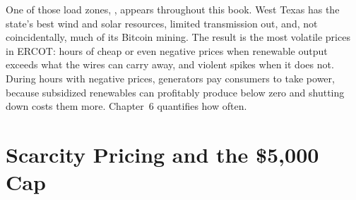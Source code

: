 One of those load zones, , appears throughout this book. West Texas has the state's best wind and solar resources, limited transmission out, and, not coincidentally, much of its Bitcoin mining. The result is the most volatile prices in ERCOT: hours of cheap or even negative prices when renewable output exceeds what the wires can carry away, and violent spikes when it does not. During hours with negative prices, generators pay consumers to take power, because subsidized renewables can profitably produce below zero and shutting down costs them more. Chapter~6 quantifies how often.

\section{Scarcity Pricing and the \texorpdfstring{\$5,000}{USD 5,000} Cap}
\label{sec:ordc}

